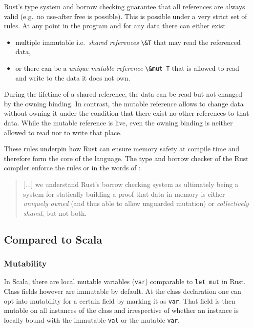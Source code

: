 Rust's type system and borrow checking guarantee that all references are
always valid (e.g.~no use-after free is possible). This is possible
under a very strict set of rules. At any point in the program and for
any data there can either exist

\begin{itemize}
\tightlist
\item
  multiple immutable i.e.~\emph{shared references}
  \passthrough{\lstinline!\&T!} that may read the referenced data,
\item
  or there can be a \emph{unique mutable reference}
  \passthrough{\lstinline!\&mut T!} that is allowed to read and write
  to the data it does not own.
\end{itemize}

During the lifetime of a shared reference, the data can be read but not
changed by the owning binding. In contrast, the mutable reference allows
to change data without owning it under the condition that there exist no
other references to that data. While the mutable reference is live, even
the owning binding is neither allowed to read nor to write that place.

These rules underpin how Rust can ensure memory safety at compile time
and therefore form the core of the language. The type and borrow checker
of the Rust compiler enforce the rules or in the words of \citet{oxide}:

\begin{quote}
{[...]} we understand Rust's borrow checking system as ultimately being a system
for statically building a proof that data in memory is either
\emph{uniquely owned} (and thus able to allow unguarded mutation) or
\emph{collectively shared}, but not both.
\end{quote}

\subsection{Compared to Scala}

\subsubsection{Mutability}

In Scala, there are local mutable variables
(\passthrough{\lstinline!var!}) comparable to
\passthrough{\lstinline!let mut!} in Rust. Class fields however are
immutable by default. At the class declaration one can opt into
mutability for a certain field by marking it as
\passthrough{\lstinline!var!}. That field is then mutable on all
instances of the class and irrespective of whether an instance is
locally bound with the immutable \passthrough{\lstinline!val!} or the
mutable \passthrough{\lstinline!var!}.

